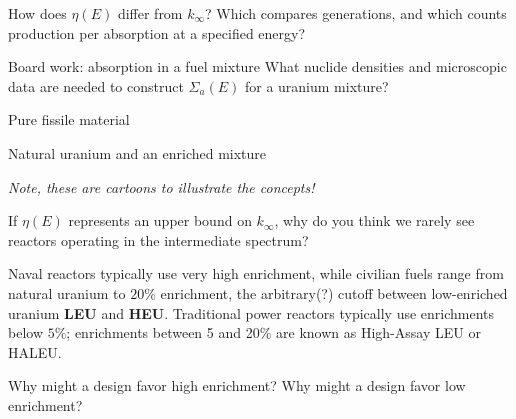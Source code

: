 \begin{handoutcolumns}
\begin{checkpoint}
How does $\eta(E)$ differ from $k_\infty$? Which compares generations,
and which counts production per absorption at a specified energy?
\end{checkpoint}

\begin{boardbox}{Board work: absorption in a fuel mixture}
What nuclide densities and microscopic data are needed to construct
$\Sigma_a(E)$ for a uranium mixture?
\end{boardbox}

\switchcolumn
\RaggedRight
{}
\begin{fixedbox}{Pure fissile material}
\centering
\LessonEightPureFuelSketch\par
\end{fixedbox}

\begin{fixedbox}{Natural uranium and an enriched mixture}
\centering
\LessonEightMixtureSketch\par
\end{fixedbox}
{\sffamily\scriptsize\itshape\color{KSUGray}
Note, these are cartoons to illustrate the concepts!\par}



\begin{checkpoint}[Ponderable]
If $\eta(E)$ represents an upper bound on $k_{\infty}$, why do you think
we rarely see reactors operating in the intermediate spectrum?
\end{checkpoint}

Naval reactors typically use very high enrichment,
while civilian fuels range from natural uranium to $20\%$ enrichment,
the arbitrary(?) cutoff between low-enriched uranium \textbf{LEU} and \textbf{HEU}.
Traditional power reactors typically use enrichments below $5\%$; enrichments
between 5 and 20\% are known as High-Assay LEU or HALEU.

\begin{checkpoint}
Why might a design favor high enrichment?
Why might a design favor low enrichment?
\end{checkpoint}
\end{handoutcolumns}

\newpage

